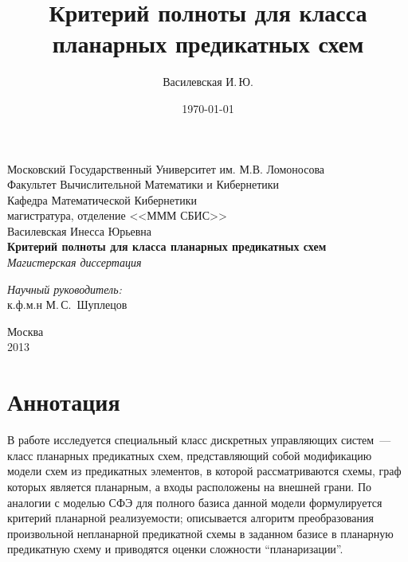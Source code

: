 \documentclass[12pt]{extarticle}
\title{Критерий полноты для класса планарных предикатных схем}
\author{Василевская И.\,Ю.}
\date{\today}
\begin{document}
    \begin{titlepage}
        \begin{center}
            Московский Государственный Университет им. М.В. Ломоносова\\
            Факультет Вычислительной Математики и Кибернетики\\
            Кафедра Математической Кибернетики\\
            магистратура, отделение <<МММ СБИС>>\\[6cm]

            \large {Василевская Инесса Юрьевна}\\
            \LARGE \textbf {Критерий полноты для класса планарных предикатных схем}\\[0.8cm]
            \large \emph {Магистерская диссертация}\\[5.0cm]

            \begin{flushright}
                \large
                \begin{minipage}{0.40\textwidth}
                    \begin{flushleft}
                        \emph{Научный руководитель:}\\к.ф.м.н М.\,С.~Шуплецов
                    \end{flushleft}
                \end{minipage}
            \end{flushright}

            \vfill
            Москва\\
			2013
        \end{center}
    \end{titlepage}

\setcounter{page}{2}

\section*{Аннотация}
\label{anno}
В работе исследуется специальный класс дискретных управляющих систем~--- класс планарных предикатных схем, 
представляющий собой модификацию модели схем из предикатных элементов, в которой рассматриваются схемы,
граф которых является планарным, а входы расположены на внешней грани.
По аналогии с моделью СФЭ для полного базиса данной модели формулируется критерий планарной
реализуемости; описывается алгоритм преобразования произвольной непланарной предикатной схемы 
в заданном базисе в планарную предикатную схему и приводятся оценки сложности ``планаризации''.
\tableofcontents
\clearpage
\end{document}
